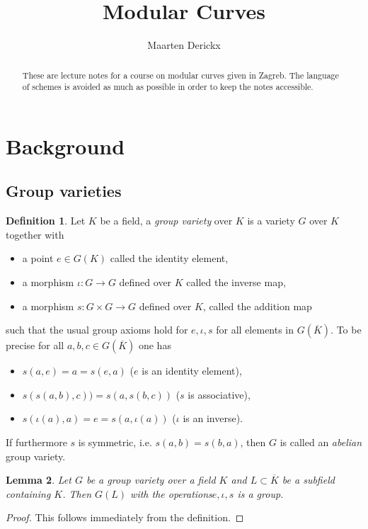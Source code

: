 \documentclass[a4paper,12pt,reqno]{amsart}
\title{Modular Curves}
\author{Maarten Derickx}
\newtheorem{lemma}{Lemma}
\theoremstyle{definition}
\newtheorem{definition}[lemma]{Definition}
\numberwithin{lemma}{section}
\numberwithin{equation}{section}
\numberwithin{figure}{section}
\begin{document}
\begin{abstract}
These are lecture notes for a course on modular curves given in Zagreb. The language of schemes is avoided as much as possible in order to keep the notes accessible.
\end{abstract}

\maketitle
\tableofcontents

\section{Background}

\subsection{Group varieties}
\begin{definition}\label{def:group-variety}
Let $K$ be a field, a \textit{group variety} over $K$ is a variety $G$ over $K$ together with 
\begin{itemize}
	\item a point $e \in G(K)$ called the identity element,
	\item a morphism $\iota: G \to G$ defined over $K$ called the inverse map,
	\item a morphism $s: G \times G \to G$ defined over $K$, called the addition map
\end{itemize}
such that the usual group axioms hold for $e, \iota, s$ for all elements in $G(\overline K)$. To be precise for all $a,b,c \in G(\overline K)$ one has
\begin{itemize}
	\item $s(a,e)=a = s(e,a)$ ($e$ is an identity element),
	\item $s(s(a,b),c)) = s(a,s(b,c))$ ($s$ is associative),
	\item $s(\iota(a),a) = e = s(a, \iota(a))$ ($\iota$ is an inverse).
\end{itemize}
If furthermore $s$ is symmetric, i.e. $s(a,b)=s(b,a)$, then $G$ is called an \textit{abelian} group variety.
\end{definition}

\begin{lemma}\label{lem:group-structure-on-group-variety}
	Let $G$ be a group variety over a field $K$ and $L\subset \overline K$ be a subfield containing $K$. Then $G(L)$ with the operations$e,\iota, s$ is a group.
\end{lemma}
\begin{proof}
	This follows immediately from the definition.
\end{proof}
\end{document}
